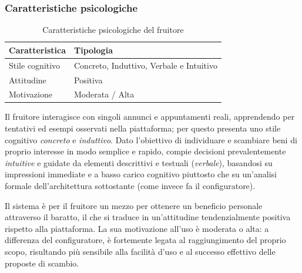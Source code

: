 \subsubsection{Caratteristiche psicologiche}
\begin{table}[H]
    \centering
    \begin{tabular}{@{}>{\raggedright\arraybackslash}p{4cm}>{\raggedright\arraybackslash}p{8cm}@{}}
        \toprule
        \textbf{Caratteristica} & \textbf{Tipologia}                       \\ \midrule
        Stile cognitivo         & Concreto, Induttivo, Verbale e Intuitivo \\
        Attitudine              & Positiva                                 \\
        Motivazione             & Moderata / Alta                          \\ \bottomrule
    \end{tabular}
    \caption{Caratteristiche psicologiche del fruitore}
\end{table}
Il fruitore interagisce con singoli annunci e appuntamenti reali, apprendendo per tentativi ed esempi osservati nella piattaforma; per questo presenta uno stile cognitivo \emph{concreto} e \emph{induttivo}.
Dato l'obiettivo di individuare e scambiare beni di proprio interesse in modo semplice e rapido, compie decisioni prevalentemente \emph{intuitive} e guidate da elementi descrittivi e testuali (\emph{verbale}), basandosi su impressioni immediate e a basso carico cognitivo piuttosto che su un'analisi formale dell'architettura sottostante (come invece fa il configuratore).

Il sistema è per il fruitore un mezzo per ottenere un beneficio personale attraverso il baratto, il che si traduce in un'attitudine tendenzialmente positiva rispetto alla piattaforma. La sua motivazione all'uso è moderata o alta: a differenza del configuratore, è fortemente legata al raggiungimento del proprio scopo, risultando più sensibile alla facilità d'uso e al successo effettivo delle proposte di scambio.


